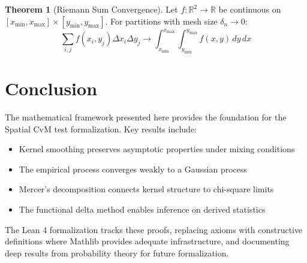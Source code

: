 \documentclass[11pt,a4paper]{article}
\theoremstyle{definition}
\newtheorem{theorem}{Theorem}[section]
\begin{document}
\begin{theorem}[Riemann Sum Convergence]
Let $f: \mathbb{R}^2 \to \mathbb{R}$ be continuous on $[x_{\min}, x_{\max}] \times [y_{\min}, y_{\max}]$. For partitions with mesh size $\delta_n \to 0$:
\begin{equation}
\sum_{i,j} f(x_i, y_j) \Delta x_i \Delta y_j \longrightarrow \int_{x_{\min}}^{x_{\max}} \int_{y_{\min}}^{y_{\max}} f(x,y) \, dy \, dx
\end{equation}
\end{theorem}

\section{Conclusion}

The mathematical framework presented here provides the foundation for the Spatial CvM test formalization. Key results include:
\begin{itemize}
    \item Kernel smoothing preserves asymptotic properties under mixing conditions
    \item The empirical process converges weakly to a Gaussian process
    \item Mercer's decomposition connects kernel structure to chi-square limits
    \item The functional delta method enables inference on derived statistics
\end{itemize}

The Lean 4 formalization tracks these proofs, replacing axioms with constructive definitions where Mathlib provides adequate infrastructure, and documenting deep results from probability theory for future formalization.
\end{document}
